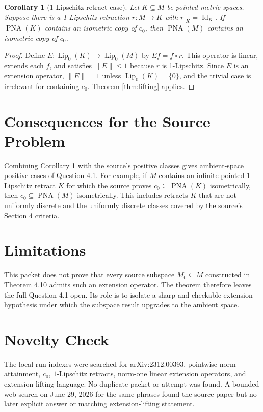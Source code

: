 \documentclass[11pt]{article}
\newtheorem{corollary}{Corollary}
\newcommand{\Lip}{\operatorname{Lip}_0}
\newcommand{\PNA}{\operatorname{PNA}}
\begin{document}
\begin{corollary}[1-Lipschitz retract case]
\label{cor:retract}
Let \(K\subseteq M\) be pointed metric spaces.  Suppose there is a
1-Lipschitz retraction \(r:M\to K\) with \(r|_K=\operatorname{Id}_K\).  If
\(\PNA(K)\) contains an isometric copy of \(c_0\), then \(\PNA(M)\) contains
an isometric copy of \(c_0\).
\end{corollary}

\begin{proof}
Define \(E:\Lip(K)\to\Lip(M)\) by \(Ef=f\circ r\).  This operator is linear,
extends each \(f\), and satisfies \(\|E\|\le 1\) because \(r\) is
1-Lipschitz.  Since \(E\) is an extension operator, \(\|E\|=1\) unless
\(\Lip(K)=\{0\}\), and the trivial case is irrelevant for containing \(c_0\).
Theorem \ref{thm:lifting} applies.
\end{proof}

\section*{Consequences for the Source Problem}

Combining Corollary \ref{cor:retract} with the source's positive classes gives
ambient-space positive cases of Question 4.1.  For example, if \(M\) contains
an infinite pointed 1-Lipschitz retract \(K\) for which the source proves
\(c_0\subseteq\PNA(K)\) isometrically, then \(c_0\subseteq\PNA(M)\)
isometrically.  This includes retracts \(K\) that are not uniformly discrete
and the uniformly discrete classes covered by the source's Section 4
criteria.

\section*{Limitations}

This packet does not prove that every source subspace \(M_0\subseteq M\)
constructed in Theorem 4.10 admits such an extension operator.  The theorem
therefore leaves the full Question 4.1 open.  Its role is to isolate a sharp
and checkable extension hypothesis under which the subspace result upgrades
to the ambient space.

\section*{Novelty Check}

The local run indexes were searched for arXiv:2312.00393, pointwise
norm-attainment, \(c_0\), \(1\)-Lipschitz retracts, norm-one linear extension
operators, and extension-lifting language.  No duplicate packet or attempt was
found.  A bounded web search on June 29, 2026 for the same phrases found the
source paper but no later explicit answer or matching extension-lifting
statement.
\end{document}
